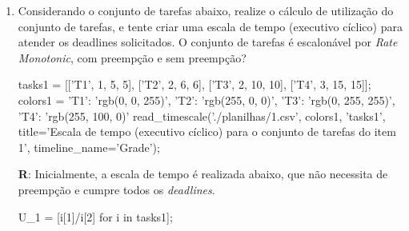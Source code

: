 \documentclass[
	10pt,				%
	openright,			%
	oneside,			%
	a4paper,			%
	english,			%
	french,				%
	spanish,			%
	brazil,				%
	]{abntex2}
\newcommand{\ª}{%
\textordfeminine
}
\begin{document}
\begin{enumerate}
\item Considerando o conjunto de tarefas abaixo, realize o cálculo de utilização do conjunto de tarefas, e
tente criar uma escala de tempo (executivo cíclico) para atender os deadlines solicitados. O conjunto
de tarefas é escalonável por \textit{Rate Monotonic}, com preempção e sem preempção?

\begin{sagesilent}
tasks1 = [['T1', 1, 5, 5], ['T2', 2, 6, 6], ['T3', 2, 10, 10], ['T4', 3, 15, 15]];
colors1 = {'T1': 'rgb(0, 0, 255)',
          'T2': 'rgb(255, 0, 0)',
          'T3': 'rgb(0, 255, 255)',
          'T4': 'rgb(255, 100, 0)'}
read_timescale('./planilhas/1.csv', colors1, 'tasks1', title='Escala de tempo (executivo cíclico) para o conjunto de tarefas do item 1', timeline_name='Grade');
\end{sagesilent}

\begin{center}
\end{center}
\textbf{R}: Inicialmente, a escala de tempo é realizada abaixo, que não necessita de preempção e cumpre todos os \textit{deadlines}.
\begin{center}
\end{center}

\begin{sagesilent}
U_1 = [i[1]/i[2] for i in tasks1];
\end{sagesilent}


\end{enumerate}
\end{document}
